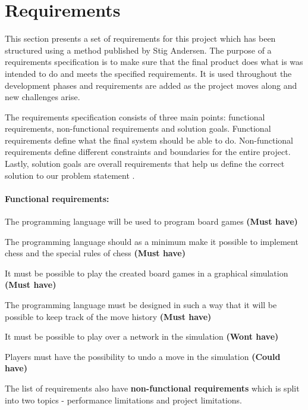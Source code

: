 \section{Requirements}
This section presents a set of requirements for this project which has been structured using a method published by Stig Andersen\cite{dengodekravspecifikation}. The purpose of a requirements specification is to make sure that the final product does what is was intended to do and meets the specified requirements. It is used throughout the development phases and requirements are added as the project moves along and new challenges arise.

The requirements specification consists of three main points: functional requirements, non-functional requirements and solution goals. Functional requirements define what the final system should be able to do. Non-functional requirements define different constraints and boundaries for the entire project. Lastly, solution goals are overall requirements that help us define the correct solution to our problem statement \cite{requirementsGuide}.


\paragraph*{Functional requirements:}
\begin{dlist}
  \item The programming language will be used to program board games \textbf{(Must have)}
  \item The programming language should as a minimum make it possible to implement chess and the special rules of chess \textbf{(Must have)}
  \item It must be possible to play the created board games in a graphical simulation \textbf{(Must have)}
  \item The programming language must be designed in such a way that it will be possible to keep track of the move history \textbf{(Must have)}
  \item It must be possible to play over a network in the simulation \textbf{(Wont have)}
  \item Players must have the possibility to undo a move in the simulation \textbf{(Could have)}
\end{dlist}

The list of requirements also have \textbf{non-functional requirements} which is split into two topics - performance limitations and project limitations.

